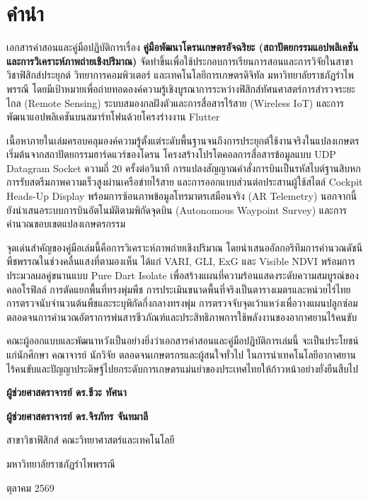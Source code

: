 \chapter*{คำนำ}

เอกสารคำสอนและคู่มือปฏิบัติการเรื่อง \textbf{คู่มือพัฒนาโดรนเกษตรอัจฉริยะ (สถาปัตยกรรมแอปพลิเคชันและการวิเคราะห์ภาพถ่ายเชิงปริมาณ)} จัดทำขึ้นเพื่อใช้ประกอบการเรียนการสอนและการวิจัยในสาขาวิชาฟิสิกส์ประยุกต์ วิทยาการคอมพิวเตอร์ และเทคโนโลยีการเกษตรดิจิทัล มหาวิทยาลัยราชภัฏรำไพพรรณี โดยมีเป้าหมายเพื่อถ่ายทอดองค์ความรู้เชิงบูรณาการระหว่างฟิสิกส์ทัศนศาสตร์การสำรวจระยะไกล (Remote Sensing) ระบบสมองกลฝังตัวและการสื่อสารไร้สาย (Wireless IoT) และการพัฒนาแอปพลิเคชันบนสมาร์ทโฟนด้วยโครงร่างงาน Flutter

เนื้อหาภายในเล่มครอบคลุมองค์ความรู้ตั้งแต่ระดับพื้นฐานจนถึงการประยุกต์ใช้งานจริงในแปลงเกษตร เริ่มต้นจากสถาปัตยกรรมฮาร์ดแวร์ของโดรน โครงสร้างโปรโตคอลการสื่อสารข้อมูลแบบ UDP Datagram Socket ความถี่ 20 ครั้งต่อวินาที การแปลงสัญญาณคำสั่งการบินเป็นรหัสไบต์ฐานสิบหก การรับสตรีมภาพความเร็วสูงผ่านเครือข่ายไร้สาย และการออกแบบส่วนต่อประสานผู้ใช้สไตล์ Cockpit Heads-Up Display พร้อมการซ้อนภาพข้อมูลโทรมาตรเสมือนจริง (AR Telemetry) นอกจากนี้ยังนำเสนอระบบการบินอัตโนมัติตามพิกัดจุดบิน (Autonomous Waypoint Survey) และการคำนวณขอบเขตแปลงเกษตรกรรม

จุดเด่นสำคัญของคู่มือเล่มนี้คือการวิเคราะห์ภาพถ่ายเชิงปริมาณ โดยนำเสนออัลกอริทึมการคำนวณดัชนีพืชพรรณในช่วงคลื่นแสงที่ตามองเห็น ได้แก่ VARI, GLI, ExG และ Visible NDVI พร้อมการประมวลผลคู่ขนานแบบ Pure Dart Isolate เพื่อสร้างแผนที่ความร้อนแสดงระดับความสมบูรณ์ของคลอโรฟิลล์ การตัดแยกพื้นที่ทรงพุ่มพืช การประเมินขนาดพื้นที่จริงเป็นตารางเมตรและหน่วยไร่ไทย การตรวจนับจำนวนต้นพืชและระบุพิกัดกึ่งกลางทรงพุ่ม การตรวจจับจุดเว้าแหว่งเพื่อวางแผนปลูกซ่อม ตลอดจนการคำนวณอัตราการพ่นสารชีวภัณฑ์และประสิทธิภาพการใช้พลังงานของอากาศยานไร้คนขับ

คณะผู้ออกแบบและพัฒนาหวังเป็นอย่างยิ่งว่าเอกสารคำสอนและคู่มือปฏิบัติการเล่มนี้ จะเป็นประโยชน์แก่นักศึกษา คณาจารย์ นักวิจัย ตลอดจนเกษตรกรและผู้สนใจทั่วไป ในการนำเทคโนโลยีอากาศยานไร้คนขับและปัญญาประดิษฐ์ไปยกระดับการเกษตรแม่นยำของประเทศไทยให้ก้าวหน้าอย่างยั่งยืนสืบไป

\vspace{18mm}

\begin{flushright}
    \textbf{ผู้ช่วยศาสตราจารย์ ดร.ชีวะ ทัศนา}\par
    \textbf{ผู้ช่วยศาสตราจารย์ ดร.จิรภัทร จันทมาลี}\par
    \vspace{4pt}
    สาขาวิชาฟิสิกส์ คณะวิทยาศาสตร์และเทคโนโลยี\par
    มหาวิทยาลัยราชภัฏรำไพพรรณี\par
    ตุลาคม 2569
\end{flushright}

\clearpage

